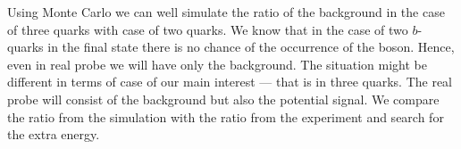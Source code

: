 Using Monte Carlo we can well simulate the ratio of the background in the case of three quarks
with case of two quarks. 
We know that in the case of two $b$-quarks in the final state there is no chance of the occurrence of
the boson. 
Hence, even in real probe we will have only the background. 
The situation might be different in terms of case of our main interest --- that is in three quarks.
The real probe will consist of the background but also the potential signal.
We compare the ratio from the simulation with the ratio from the experiment and search for the 
extra energy.
